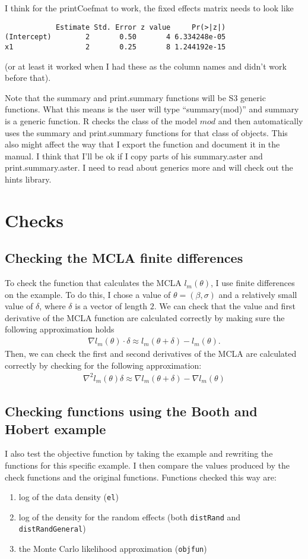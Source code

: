 \documentclass{article}
\begin{document}
I think for the printCoefmat to work, the fixed effects matrix needs to look like
\begin{verbatim}
            Estimate Std. Error z value     Pr(>|z|)
(Intercept)        2       0.50       4 6.334248e-05
x1                 2       0.25       8 1.244192e-15
\end{verbatim}
(or at least it worked when I had these as the column names and didn't work before that).

Note that the summary and print.summary functions will be S3 generic functions.  What this means is the user will type ``summary(mod)'' and summary is a generic function. R checks the class of the model $mod$ and then automatically uses the summary and print.summary functions for that class of objects. This also might affect the way that I export the function and document it in the manual.  I think that I'll be ok if I copy parts of his summary.aster and print.summary.aster. I need to read about generics more and will check out the hints library.

\section{Checks}
\subsection{Checking the MCLA finite differences}
To check the function that calculates the MCLA $l_m(\theta)$, I use finite differences on the \citet{booth:hobert:1999} example. To do this, I chose a value of $\theta=(\beta,\sigma)$ and a relatively small value of $\delta$, where $\delta$ is a vector of length $2$. We can check that the value and first derivative of the MCLA function are calculated correctly by making sure the following approximation holds
\begin{align}
\nabla l_m (\theta)  \cdot \delta \approx l_m(\theta+\delta)-l_m(\theta).
\end{align} 
Then, we can check the first and second derivatives of the MCLA are calculated correctly by checking for the following approximation:
\begin{align}
\nabla^2 l_m (\theta) \delta \approx \nabla l_m (\theta+\delta)-\nabla l_m (\theta)
\end{align}

\subsection{Checking  functions using the Booth and Hobert example}
I also test the objective function by taking the  \citet{booth:hobert:1999} example and rewriting the functions for this specific example. I then compare the values produced by the check functions and the original functions. Functions checked this way are:
\begin{enumerate}
\item log of the data density (\texttt{el})
\item log of the density for the random effects (both \texttt{distRand} and \texttt{distRandGeneral})
\item the Monte Carlo likelihood approximation (\texttt{objfun})
\end{enumerate}
\end{document}
